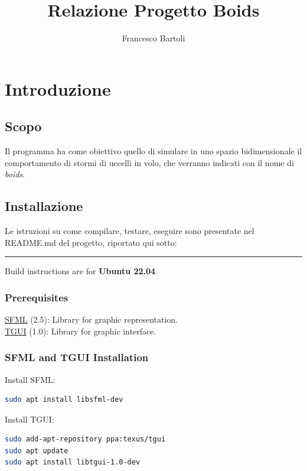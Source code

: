 \documentclass[10pt,a4paper]{article}
\title{Relazione Progetto Boids}
\author{Francesco Bartoli}
\date{}
\begin{document}
\maketitle

\hypertarget{toc}{}
\tableofcontents

\setlength{\parindent}{0pt}


\section{Introduzione}
\subsection{Scopo}
Il programma ha come obiettivo quello di simulare in uno spazio bidimensionale il comportamento di stormi di uccelli in volo, che verranno indicati con il nome di \textit{boids}. 

\subsection{Installazione}

Le istruzioni su come compilare, testare, eseguire sono presentate nel README.md del progetto, riportato qui sotto:

\par\noindent\rule{\textwidth}{0.4pt}

Build instructions are for \textbf{Ubuntu 22.04}.

\subsubsection{Prerequisites}

\href{https://github.com/SFML/SFML}{SFML} (2.5): Library for graphic representation. \\
\href{https://github.com/texus/TGUI}{TGUI} (1.0): Library for graphic interface.

\subsubsection{SFML and TGUI Installation}

Install SFML:

\begin{lstlisting}[style=codecolour, language=bash]
sudo apt install libsfml-dev
\end{lstlisting}

Install TGUI:

\begin{lstlisting}[style=codecolour, language=bash]
sudo add-apt-repository ppa:texus/tgui
sudo apt update
sudo apt install libtgui-1.0-dev
\end{lstlisting}
\end{document}
